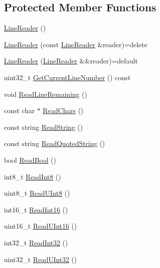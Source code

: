 \subsection*{Protected Member Functions}
\begin{DoxyCompactItemize}
\item 
\hyperlink{classmage_1_1_line_reader_ab4a46321d7ea3ecda2d6390c78a7285b}{Line\+Reader} ()
\item 
\hyperlink{classmage_1_1_line_reader_ae4f871bebae110704b34c0bd88460639}{Line\+Reader} (const \hyperlink{classmage_1_1_line_reader}{Line\+Reader} \&reader)=delete
\item 
\hyperlink{classmage_1_1_line_reader_a0a9e80aabd15594f3e20bf7265e16c5e}{Line\+Reader} (\hyperlink{classmage_1_1_line_reader}{Line\+Reader} \&\&reader)=default
\item 
uint32\+\_\+t \hyperlink{classmage_1_1_line_reader_a55f35bf4989ad109524da146639870d6}{Get\+Current\+Line\+Number} () const
\item 
void \hyperlink{classmage_1_1_line_reader_a3a4b99bfef1e8a826d74a01bcc663fcb}{Read\+Line\+Remaining} ()
\item 
const char $\ast$ \hyperlink{classmage_1_1_line_reader_ad915c1a17549c7758c10f0b6db7e5611}{Read\+Chars} ()
\item 
const string \hyperlink{classmage_1_1_line_reader_a58a27b637574ce56ea17a575aa540675}{Read\+String} ()
\item 
const string \hyperlink{classmage_1_1_line_reader_ae9a7547d01b29c3237b198444d4f3aef}{Read\+Quoted\+String} ()
\item 
bool \hyperlink{classmage_1_1_line_reader_a86289c358afe9b3bc5c7789bb8a6af95}{Read\+Bool} ()
\item 
int8\+\_\+t \hyperlink{classmage_1_1_line_reader_a3b88ec3a8555d79b25c2a8818a26f124}{Read\+Int8} ()
\item 
uint8\+\_\+t \hyperlink{classmage_1_1_line_reader_a943ce0074c0861109f8b4ee10df8a221}{Read\+U\+Int8} ()
\item 
int16\+\_\+t \hyperlink{classmage_1_1_line_reader_a5ec3ccfcd1044f6be73c51082d2b57e3}{Read\+Int16} ()
\item 
uint16\+\_\+t \hyperlink{classmage_1_1_line_reader_a89f8d84257eae17db8c1e67d17f839f9}{Read\+U\+Int16} ()
\item 
int32\+\_\+t \hyperlink{classmage_1_1_line_reader_a45c66ad0b4676ef3fb2b5b08f04b509d}{Read\+Int32} ()
\item 
uint32\+\_\+t \hyperlink{classmage_1_1_line_reader_a82d14aede3b4ebff8cc54345dfba2c4b}{Read\+U\+Int32} ()

\end{DoxyCompactItemize}
